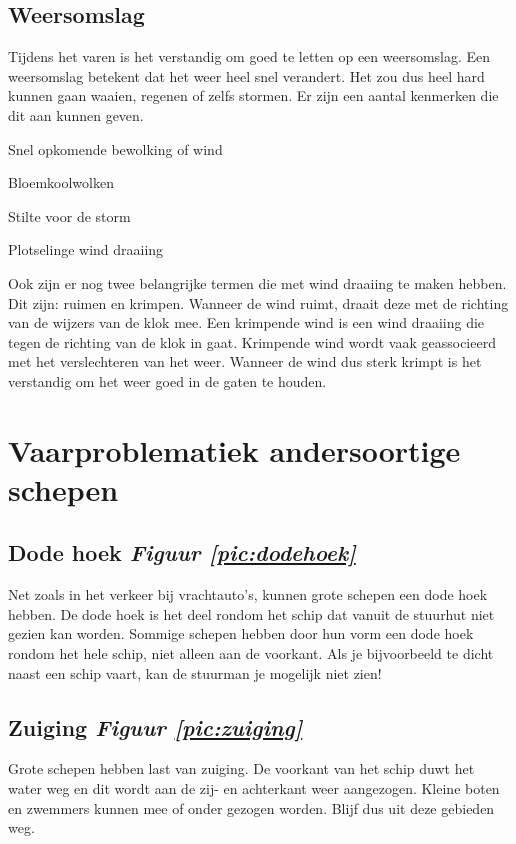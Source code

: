 \subsection{Weersomslag}
Tijdens het varen is het verstandig om goed te letten op een weersomslag. Een weersomslag betekent dat het weer heel snel verandert. Het zou dus heel hard kunnen gaan waaien, regenen of zelfs stormen. Er zijn een aantal kenmerken die dit aan kunnen geven. 
\begin{itemize}
    \begin{multicols}{2}
    \item Snel opkomende bewolking of wind
    \item Bloemkoolwolken
    \item Stilte voor de storm
    \item Plotselinge wind draaiing
    \end{multicols}
\end{itemize}
Ook zijn er nog twee belangrijke termen die met wind draaiing te maken hebben. Dit zijn: ruimen en krimpen. Wanneer de wind ruimt, draait deze met de richting van de wijzers van de klok mee. Een krimpende wind is een wind draaiing die tegen de richting van de klok in gaat. Krimpende wind wordt vaak geassocieerd met het verslechteren van het weer. Wanneer de wind dus sterk krimpt is het verstandig om het weer goed in de gaten te houden.

\newpage
\section{Vaarproblematiek andersoortige schepen}
\subsection{Dode hoek \hfill \textit{Figuur \ref{pic:dodehoek}}}
Net zoals in het verkeer bij vrachtauto's, kunnen grote schepen een dode hoek hebben. De dode hoek is het deel rondom het schip dat vanuit de stuurhut niet gezien kan worden. Sommige schepen hebben door hun vorm een dode hoek rondom het hele schip, niet alleen aan de voorkant. Als je bijvoorbeeld te dicht naast een schip vaart, kan de stuurman je mogelijk niet zien!

\subsection{Zuiging \hfill \textit{Figuur \ref{pic:zuiging}}}
Grote schepen hebben last van zuiging. De voorkant van het schip duwt het water weg en dit wordt aan de zij- en achterkant weer aangezogen. Kleine boten en zwemmers kunnen mee of onder gezogen worden. Blijf dus uit deze gebieden weg.


